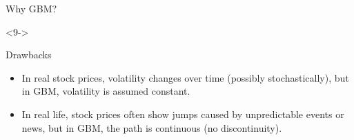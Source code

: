 \documentclass[10pt]{beamer}
\begin{document}
\begin{frame}[t]
\begin{onlyenv}
\begin{block}{Why GBM?}
\begin{itemize}
      \end{itemize}
    \end{block}
  \end{onlyenv}
  \begin{onlyenv}<9->
    \begin{block}{Drawbacks}
    \begin{itemize}
      \item<10-> In real stock prices, volatility changes over time (possibly stochastically), but in GBM, volatility is assumed constant.
      \item <11-> In real life, stock prices often show jumps caused by unpredictable events or news, but in GBM, the path is continuous (no discontinuity).
    \end{itemize}
    \end{block}
  \end{onlyenv}
\end{frame}
\end{document}
